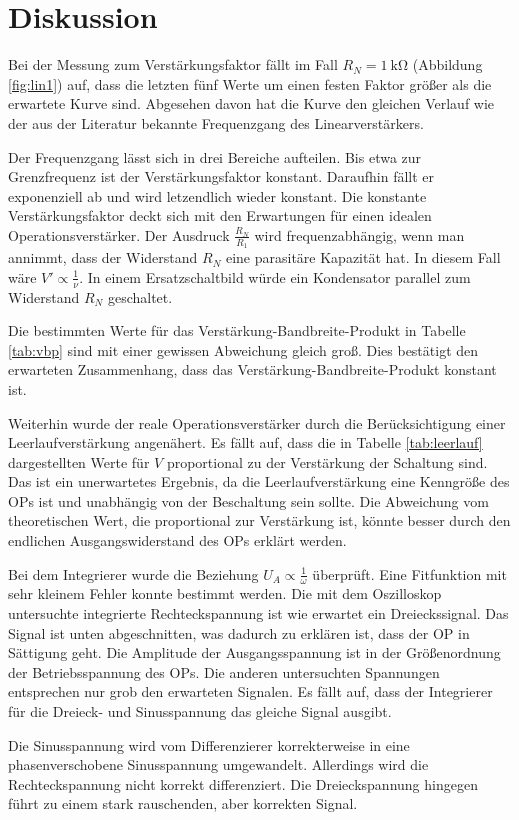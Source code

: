 \section{Diskussion}
Bei der Messung zum Verstärkungsfaktor fällt im Fall $R_N = \SI{1}{\kilo \ohm}$ (Abbildung \ref{fig:lin1}) auf, dass die letzten fünf Werte um einen festen Faktor größer als die erwartete Kurve sind.
Abgesehen davon hat die Kurve den gleichen Verlauf wie der aus der  Literatur bekannte Frequenzgang des Linearverstärkers.

Der Frequenzgang lässt sich in drei Bereiche aufteilen.
Bis etwa zur Grenzfrequenz ist der Verstärkungsfaktor konstant.
Daraufhin fällt er exponenziell ab und wird letzendlich wieder konstant.
Die konstante Verstärkungsfaktor deckt sich mit den Erwartungen für einen idealen Operationsverstärker.
Der Ausdruck $\frac{R_N}{R_1}$ wird frequenzabhängig, wenn man annimmt, dass der Widerstand $R_N$ eine parasitäre Kapazität hat.
In diesem Fall wäre $V' \propto \frac{1}{\nu}$.
In einem Ersatzschaltbild würde ein Kondensator parallel zum Widerstand $R_N$ geschaltet.

Die bestimmten Werte für das Verstärkung-Bandbreite-Produkt in Tabelle \ref{tab:vbp} sind mit einer gewissen Abweichung gleich groß.
Dies bestätigt den erwarteten Zusammenhang, dass das Verstärkung-Bandbreite-Produkt konstant ist.

Weiterhin wurde der reale Operationsverstärker durch die Berücksichtigung einer Leerlaufverstärkung angenähert.
Es fällt auf, dass die in Tabelle \ref{tab:leerlauf} dargestellten Werte für $V$ proportional zu der Verstärkung der Schaltung sind.
Das ist ein unerwartetes Ergebnis, da die Leerlaufverstärkung eine Kenngröße des OPs ist und unabhängig von der Beschaltung sein sollte.
Die Abweichung vom theoretischen Wert, die proportional zur Verstärkung ist, könnte besser durch den endlichen Ausgangswiderstand des OPs erklärt werden.

Bei dem Integrierer wurde die Beziehung $U_A \propto \frac{1}{\omega}$ überprüft.
Eine Fitfunktion mit sehr kleinem Fehler konnte bestimmt werden.
Die mit dem Oszilloskop untersuchte integrierte Rechteckspannung ist wie erwartet ein Dreieckssignal.
Das Signal ist unten abgeschnitten, was dadurch zu erklären ist, dass der OP in Sättigung geht.
Die Amplitude der Ausgangsspannung ist in der Größenordnung der Betriebsspannung des OPs.
Die anderen untersuchten Spannungen entsprechen nur grob den erwarteten Signalen.
Es fällt auf, dass der Integrierer für die Dreieck- und Sinusspannung das gleiche Signal ausgibt.

Die Sinusspannung wird vom Differenzierer korrekterweise in eine phasenverschobene Sinusspannung umgewandelt.
Allerdings wird die Rechteckspannung nicht korrekt differenziert.
Die Dreieckspannung hingegen führt zu einem stark rauschenden, aber korrekten Signal.